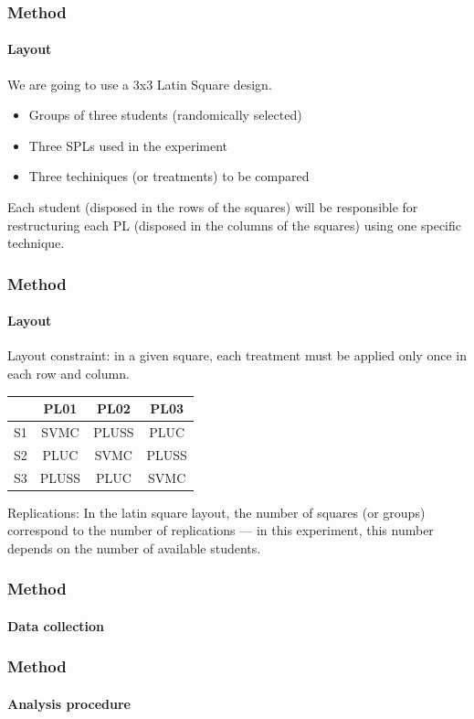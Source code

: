 \documentclass{beamer}
\begin{document}
\begin{frame}
\frametitle{Method}
\framesubtitle{Layout}

We are going to use a \alert{3x3} Latin Square design. 

\begin{itemize}
  \item Groups of \alert{three students} (randomically selected)
  \item \alert{Three SPLs} used in the experiment
  \item Three techiniques (or treatments) to be compared
\end{itemize}

Each student (disposed in the rows of the squares) will be responsible for
restructuring each PL (disposed in the columns of the squares) using one
specific technique. 

\end{frame}

\begin{frame}
\frametitle{Method}
\framesubtitle{Layout}

\alert{Layout constraint:} in a given square, each treatment must be applied
only once in each row and column.

\begin{center}
\small{
\begin{tabular}{l|c|c|c}
 		& 	PL01 	& 	PL02 	& PL03 		\\ \hline
 S1   	&	SVMC    &  	PLUSS   &  PLUC		\\ \hline
 S2   	&	PLUC    &   SVMC   	&  PLUSS	\\ \hline	
 S3   	&	PLUSS   &   PLUC  	&  SVMC		\\ \hline
\end{tabular}
}
\end{center}

\alert{Replications:} In the latin square layout, the number of squares (or
groups) correspond to the number of replications --- in this experiment, this number
depends on the number of available students.

\end{frame}

\begin{frame}
\frametitle{Method}
\framesubtitle{Data collection}

\end{frame}

\begin{frame}
\frametitle{Method}
\framesubtitle{Analysis procedure}

\end{frame}
\end{document}
